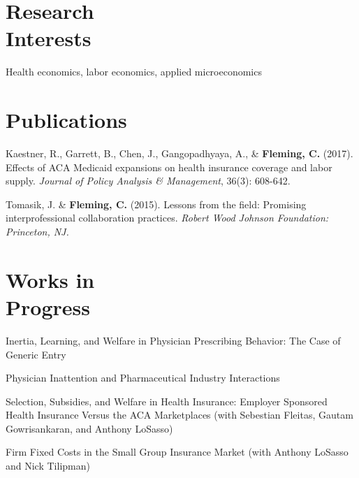 \documentclass[margin, 10pt]{res} %
\begin{document}
\begin{resume}
\section{Research \\ Interests}
Health economics, labor economics, applied microeconomics \\


\section{Publications}
Kaestner, R., Garrett, B., Chen, J., Gangopadhyaya, A., \& \textbf{Fleming, C.} (2017). Effects of ACA Medicaid expansions on health insurance coverage and labor supply. \textit{Journal of Policy Analysis \& Management}, 36(3): 608-642.

Tomasik, J. \& \textbf{Fleming, C.} (2015). Lessons from the field: Promising interprofessional collaboration practices. \textit{Robert Wood Johnson Foundation: Princeton, NJ.}


\section{Works in \\ Progress}
Inertia, Learning, and Welfare in Physician Prescribing Behavior: The Case of Generic Entry

Physician Inattention and Pharmaceutical Industry Interactions

Selection, Subsidies, and Welfare in Health Insurance: Employer Sponsored Health Insurance Versus the ACA Marketplaces (with Sebestian Fleitas, Gautam Gowrisankaran, and Anthony LoSasso)

Firm Fixed Costs in the Small Group Insurance Market (with Anthony LoSasso and Nick Tilipman)

 

\end{resume}
\end{document}
